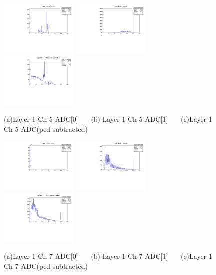\documentclass[a4paper,11pt]{article}
\theoremstyle{mytheor}
\begin{document}
\begin{figure}[H] 
\vspace*{-0.3cm} 
\includegraphics[width=0.33\textwidth,scale=0.5,trim=0 0 0 0,clip]{plotsdir/file0_test-Layer1_Ch5_adc0-1.pdf} 
\includegraphics[width=0.33\textwidth,scale=0.5,trim=0 0 0 0,clip]{plotsdir/file0_test-Layer1_Ch5_adc1-1.pdf} 
\includegraphics[width=0.33\textwidth,scale=0.5,trim=0 0 0 0,clip]{plotsdir/file0_test-Layer1_Ch5_adcPedsub-1.pdf} 
\caption{(a)Layer 1 Ch 5 ADC[0] ~~~(b) Layer 1 Ch 5 ADC[1] ~~~(c)Layer 1 Ch 5 ADC(ped subtracted) } 
\end{figure} 
\begin{figure}[H] 
\vspace*{-0.3cm} 
\includegraphics[width=0.33\textwidth,scale=0.5,trim=0 0 0 0,clip]{plotsdir/file0_test-Layer1_Ch7_adc0-1.pdf} 
\includegraphics[width=0.33\textwidth,scale=0.5,trim=0 0 0 0,clip]{plotsdir/file0_test-Layer1_Ch7_adc1-1.pdf} 
\includegraphics[width=0.33\textwidth,scale=0.5,trim=0 0 0 0,clip]{plotsdir/file0_test-Layer1_Ch7_adcPedsub-1.pdf} 
\caption{(a)Layer 1 Ch 7 ADC[0] ~~~(b) Layer 1 Ch 7 ADC[1] ~~~(c)Layer 1 Ch 7 ADC(ped subtracted) } 
\end{figure} 
\end{document}
